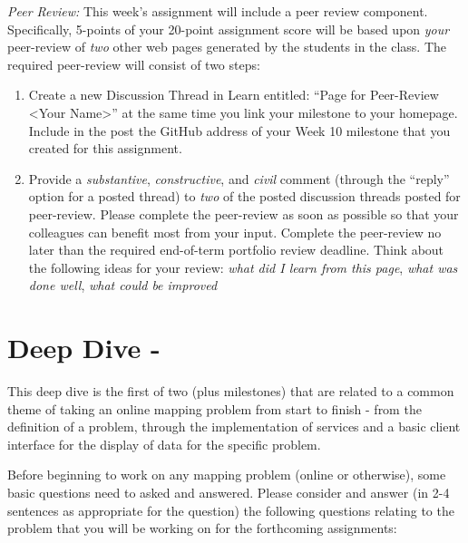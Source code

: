 \documentclass[]{book}
\begin{document}
\emph{Peer Review:} This week's assignment will include a peer review
component. Specifically, 5-points of your 20-point assignment score will
be based upon \emph{your} peer-review of \emph{two} other web pages
generated by the students in the class. The required peer-review will
consist of two steps:

\begin{enumerate}
\def\labelenumi{\arabic{enumi}.}
\item
  Create a new Discussion Thread in Learn entitled: ``Page for
  Peer-Review \textless{}Your Name\textgreater{}'' at the same time you
  link your milestone to your homepage. Include in the post the GitHub
  address of your Week 10 milestone that you created for this
  assignment.
\item
  Provide a \emph{substantive}, \emph{constructive}, and \emph{civil}
  comment (through the ``reply'' option for a posted thread) to
  \emph{two} of the posted discussion threads posted for peer-review.
  Please complete the peer-review as soon as possible so that your
  colleagues can benefit most from your input. Complete the peer-review
  no later than the required end-of-term portfolio review deadline.
  Think about the following ideas for your review: \emph{what did I
  learn from this page}, \emph{what was done well}, \emph{what could be
  improved}
\end{enumerate}

\section{Deep Dive -}\label{week11-deepDive}

This deep dive is the first of two (plus milestones) that are related to
a common theme of taking an online mapping problem from start to finish
- from the definition of a problem, through the implementation of
services and a basic client interface for the display of data for the
specific problem.

Before beginning to work on any mapping problem (online or otherwise),
some basic questions need to asked and answered. Please consider and
answer (in 2-4 sentences as appropriate for the question) the following
questions relating to the problem that you will be working on for the
forthcoming assignments:
\end{document}
